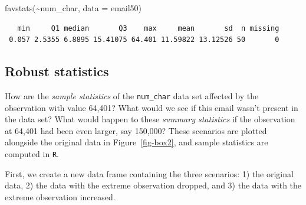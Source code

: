 \documentclass[
  letterpaper,
  DIV=11,
  numbers=noendperiod]{scrreprt}
\newenvironment{Shaded}{\begin{snugshade}}{\end{snugshade}}
\newcommand{\AttributeTok}[1]{\textcolor[rgb]{0.40,0.45,0.13}{#1}}
\newcommand{\CommentTok}[1]{\textcolor[rgb]{0.37,0.37,0.37}{#1}}
\newcommand{\DecValTok}[1]{\textcolor[rgb]{0.68,0.00,0.00}{#1}}
\newcommand{\FunctionTok}[1]{\textcolor[rgb]{0.28,0.35,0.67}{#1}}
\newcommand{\NormalTok}[1]{\textcolor[rgb]{0.00,0.23,0.31}{#1}}
\newcommand{\OtherTok}[1]{\textcolor[rgb]{0.00,0.23,0.31}{#1}}
\newcommand{\SpecialCharTok}[1]{\textcolor[rgb]{0.37,0.37,0.37}{#1}}
\newcommand{\StringTok}[1]{\textcolor[rgb]{0.13,0.47,0.30}{#1}}
\begin{document}
\begin{Shaded}
\begin{Highlighting}[]
\FunctionTok{favstats}\NormalTok{(}\SpecialCharTok{\textasciitilde{}}\NormalTok{num\_char, }\AttributeTok{data =}\NormalTok{ email50)}
\end{Highlighting}
\end{Shaded}

\begin{verbatim}
   min     Q1 median       Q3    max     mean       sd  n missing
 0.057 2.5355 6.8895 15.41075 64.401 11.59822 13.12526 50       0
\end{verbatim}

\subsection{Robust statistics}\label{robust-statistics}

How are the \emph{sample statistics} of the \texttt{num\_char} data set
affected by the observation with value 64,401? What would we see if this
email wasn't present in the data set? What would happen to these
\emph{summary statistics} if the observation at 64,401 had been even
larger, say 150,000? These scenarios are plotted alongside the original
data in Figure~\ref{fig-box2}, and sample statistics are computed in
\texttt{R}.

First, we create a new data frame containing the three scenarios: 1) the
original data, 2) the data with the extreme observation dropped, and 3)
the data with the extreme observation increased.

\begin{Shaded}
\end{Shaded}
\end{document}
